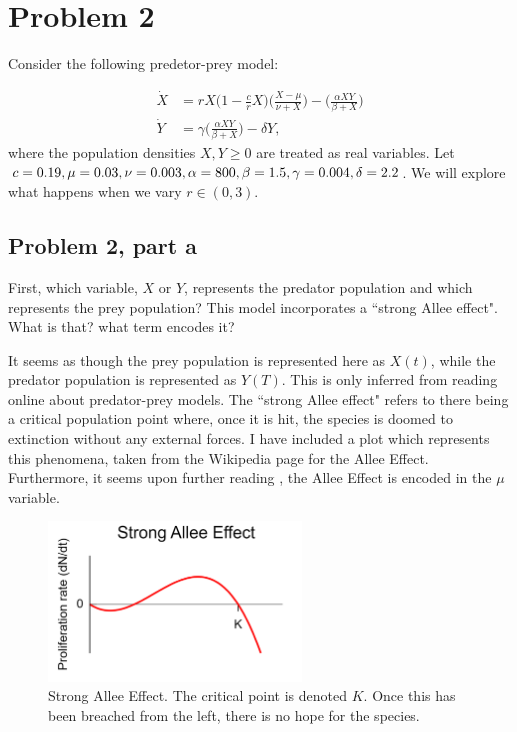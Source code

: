 \newpage
\section{Problem 2}
Consider the following predetor-prey model:

\begin{align}
    \dot{X} &= rX\bigg(1 - \frac{c}{r}X\bigg)\bigg(\frac{X - \mu}{\nu + X}\bigg) - \bigg(\frac{\alpha XY}{\beta + X}\bigg)\label{P2: model}\\
    \dot{Y} &= \gamma \bigg( \frac{\alpha XY}{\beta + X}\bigg) - \delta Y,
    \nonumber
\end{align}
where the population densities $X, Y \geq 0$ are treated as real variables. Let $c = 0.19, \mu = 0.03, \nu = 0.003, \newline  \alpha = 800, \beta = 1.5, \gamma = 0.004, \delta = 2.2$. We will explore what happens when we vary $r \in (0, 3).$

\subsection{Problem 2, part a}
First, which variable, $X$ or $Y$, represents the predator population and which represents the prey population? This model incorporates a ``strong Allee effect". What is that? what term encodes it?
\partbreak
\begin{solution}

    It seems as though the prey population is represented here as $X(t)$, while the predator population is represented as $Y(T)$. This is only inferred from reading online about predator-prey models. The ``strong Allee effect" refers to there being a critical population point where, once it is hit, the species is doomed to extinction without any external forces. I have included a plot which represents this phenomena, taken from the Wikipedia page for the Allee Effect. Furthermore, it seems upon further reading \cite{ye2019dynamic}, the Allee Effect is encoded in the $\mu$ variable.

\begin{figure}[ht]
    \centering
    \includegraphics[width = 0.6\textwidth, frame]{Images/Strong Allee Effect.png}
    \caption{Strong Allee Effect. The critical point is denoted $K$. Once this has been breached from the left, there is no hope for the species.}
    \label{fig:p2a strong allee effect}
\end{figure}
\end{solution}

